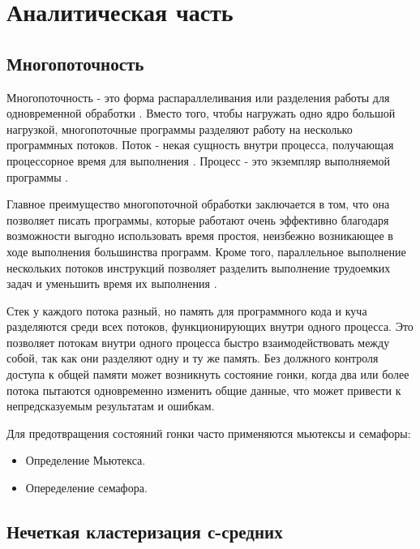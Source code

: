 \chapter{Аналитическая часть}

\section{Многопоточность}

Многопоточность - это форма распараллеливания или разделения работы для одновременной обработки \cite{intel-multithreading}. Вместо того, чтобы нагружать одно ядро большой нагрузкой, многопоточные программы разделяют работу на несколько программных потоков. Поток - некая сущность внутри процесса, получающая процессорное время для выполнения \cite{thread}. Процесс - это экземпляр выполняемой программы \cite{winForProf}.

Главное преимущество многопоточной обработки заключается в том, что она позволяет писать программы, которые работают очень эффективно благодаря возможности выгодно использовать время простоя, неизбежно возникающее в ходе выполнения большинства программ. 
Кроме того, параллельное выполнение нескольких потоков инструкций позволяет разделить выполнение трудоемких задач и уменьшить время их выполнения \cite{mult-in-apps}. 

Стек у каждого потока разный, но память для программного кода и куча разделяются среди всех потоков, функционирующих внутри одного процесса. 
Это позволяет потокам внутри одного процесса быстро взаимодействовать между собой, так как они разделяют одну и ту же память. Без должного контроля доступа к общей памяти может возникнуть состояние гонки, когда два или более потока пытаются одновременно изменить общие данные, что может привести к непредсказуемым результатам и ошибкам.

Для предотвращения состояний гонки часто применяются мьютексы и семафоры:
\begin{itemize}
	\item Определение Мьютекса.
	\item Опеределение семафора. 
\end{itemize}

\section{Нечеткая кластеризация с-средних}